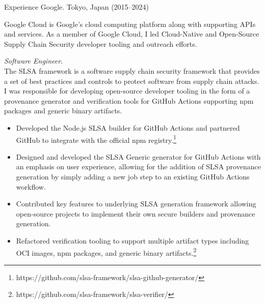 \documentclass{resume}
\begin{document}
\begin{category}{Experience}
     Google. Tokyo, Japan (2015--2024)

    Google Cloud is Google's cloud computing platform along with supporting APIs
    and services. As a member of Google Cloud, I led Cloud-Native and
    Open-Source Supply Chain Security developer tooling and outreach efforts.

    \begin{itemize}

         \emph{Software
            Engineer.}\\
            The SLSA framework is a software supply chain security framework
            that provides a set of best practices and controls to protect
            software from supply chain attacks. I was responsible for developing
            open-source developer tooling in the form of a provenance generator
            and verification tools for GitHub Actions supporting npm packages
            and generic binary artifacts.

        \begin{itemize}

            \item Developed the Node.js SLSA builder for GitHub Actions and
                partnered GitHub to integrate with the official npm
                registry.\footnote{https://github.com/slsa-framework/slsa-github-generator/}

            \item Designed and developed the SLSA Generic generator for GitHub
                Actions with an emphasis on user experience, allowing for the
                addition of SLSA provenance generation by simply adding a new job
                step to an existing GitHub Actions workflow.

            \item Contributed key features to underlying SLSA generation
                framework allowing open-source projects to implement their own
                secure builders and provenance generation.

            \item Refactored verification tooling to support multiple artifact
                types including OCI images, npm packages, and generic binary
                artifacts.\footnote{https://github.com/slsa-framework/slsa-verifier/}


\end{itemize}
\end{itemize}
\end{category}
\end{document}

